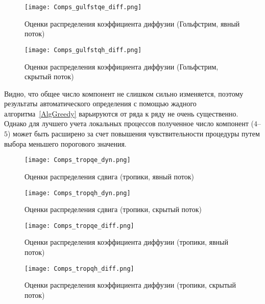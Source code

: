 \begin{figure}[!h]
	\centering
	\texttt{[image: Comps\_gulfstqe\_diff.png]}
	\caption{Оценки распределения коэффициента диффузии (Гольфстрим, явный поток)}
	\label{fig:Comps_gulfstqe_diff}
\end{figure}

\begin{figure}[!h]
	\centering
	\texttt{[image: Comps\_gulfstqh\_diff.png]}
	\caption{Оценки распределения коэффициента диффузии (Гольфстрим, скрытый поток)}
	\label{fig:Comps_gulfstqh_diff}
\end{figure}

Видно, что общее число компонент не слишком сильно изменяется, поэтому результаты автоматического определения с помощью жадного алгоритма~\ref{AlgGreedy} варьируются от ряда к ряду не очень существенно. Однако для лучшего учета локальных процессов полученное число компонент ($4$--$5$) может быть расширено за счет повышения чувствительности процедуры путем выбора меньшего порогового значения.

\begin{figure}[!h]
	\centering
	\texttt{[image: Comps\_tropqe\_dyn.png]}
	\caption{Оценки распределения сдвига (тропики, явный поток)}
	\label{fig:Comps_tropqe_dyn}
\end{figure}

\begin{figure}[!h]
	\centering
	\texttt{[image: Comps\_tropqh\_dyn.png]}
	\caption{Оценки распределения сдвига (тропики, скрытый поток)}
	\label{fig:Comps_tropqh_dyn}
\end{figure}

\begin{figure}[!h]
	\centering
	\texttt{[image: Comps\_tropqe\_diff.png]}
	\caption{Оценки распределения коэффициента диффузии (тропики, явный поток)}
	\label{fig:Comps_troptqe_diff}
\end{figure}

\begin{figure}[!h]
	\centering
	\texttt{[image: Comps\_tropqh\_diff.png]}
	\caption{Оценки распределения коэффициента диффузии (тропики, скрытый поток)}
	\label{fig:Comps_troptqh_diff}
\end{figure}
